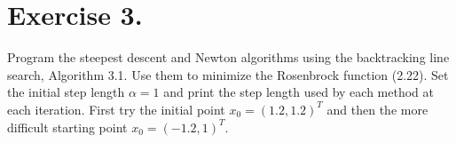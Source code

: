 
\section*{Exercise 3.}

Program the steepest descent and Newton algorithms using the backtracking line search, Algorithm 3.1. Use them to minimize the Rosenbrock function (2.22). Set the initial step length $\alpha = 1$ and print the step length used by each method at each iteration. First try the initial point $x_0 = (1.2,1.2)^T$ and then the more difficult starting point $x_0 = (-1.2, 1)^T$.